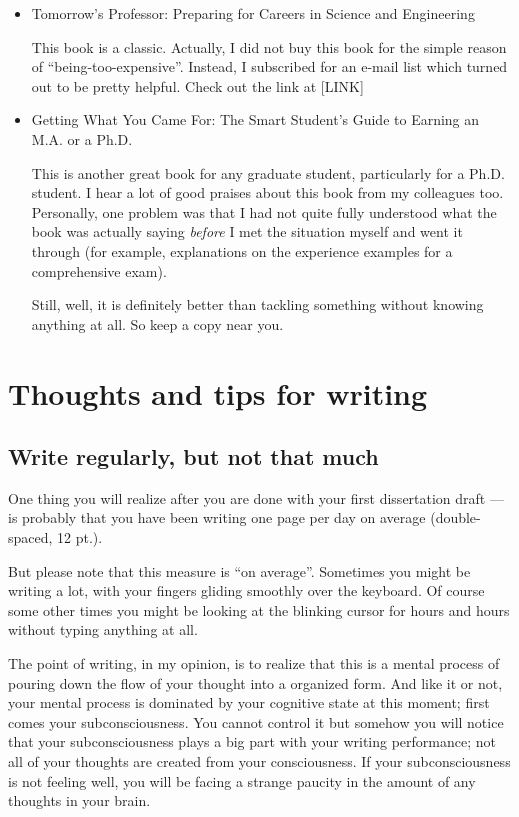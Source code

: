 \documentclass[11pt]{article}
\begin{document}
\begin{itemize}
    \item Tomorrow's Professor: Preparing for Careers in Science and
        Engineering

        This book is a classic. Actually, I did not buy this book for the
        simple reason of ``being-too-expensive''. Instead, I 
        subscribed for an e-mail list which turned out to be pretty helpful. 
        Check out the link at [LINK]

    \item Getting What You Came For: The Smart Student's Guide to Earning an
        M.A. or a Ph.D.

        This is another great book for any graduate student, particularly for
        a Ph.D. student. I hear a lot of good praises about this book from my
        colleagues too. Personally, one problem was that I had not quite fully
        understood what the book was actually saying \emph{before} I met the
        situation myself and went it through (for example, explanations on the 
        experience examples for a comprehensive exam). 

        Still, well, it is definitely better than tackling something without
        knowing anything at all. So keep a copy near you.

\end{itemize}


\section{Thoughts and tips for writing}

\subsection{Write regularly, but not that much}
One thing you will realize after you are done with your first dissertation
draft --- is probably that you have been writing one page per day on average
(double-spaced, 12 pt.).

But please note that this measure is ``on average''. Sometimes you might be
writing a lot, with your fingers gliding smoothly over the keyboard.  Of
course some other times you might be looking at the blinking cursor for hours
and hours without typing anything at all. 

The point of writing, in my opinion, is to realize that this is a mental
process of pouring down the flow of your thought into a organized form.  And
like it or not, your mental process is dominated by your cognitive state at
this moment; first comes your subconsciousness. You cannot control it but
somehow you will notice that your subconsciousness plays a big part with your
writing performance; not all of your thoughts are created from your
consciousness. If your subconsciousness is not feeling well, you will be
facing a strange paucity in the amount of any thoughts in your brain.
\end{document}
